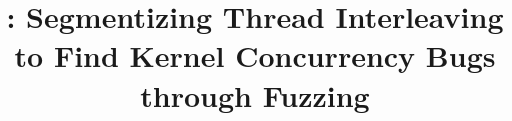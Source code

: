 \title{\sys: Segmentizing Thread Interleaving to Find Kernel Concurrency Bugs through Fuzzing}

\ifdefined\DRAFT
 \pagestyle{fancyplain}
 \rhead{\thedate}
\fi



\author{
}


